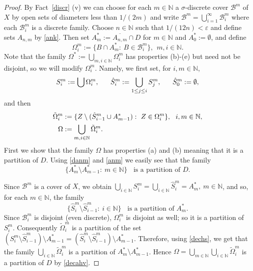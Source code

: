 \documentclass[12pt,a4paper]{amsart}
\theoremstyle{plain}
\theoremstyle{definition}
\theoremstyle{remark}
\numberwithin{equation}{section}
\newcommand{\N}{{\mathbb N}}
\newcommand{\B}{{\mathcal{B}}}
\begin{document}
\begin{proof}
	 By  Fact~\ref{discr} (v) we  can choose for each $m\in \N$ a $\sigma$-discrete cover
 $\B^m$ of $X$ by open sets of diameters
less than $1/(2m)$ 
and write $\B^m = \bigcup_{i=1}^{\infty} \B^m_i$
where each $\B^m_i$ is a discrete family.	
Choose $n\in \N$ such that $1/(12n) < \varepsilon $ and define sets $A_{n,m}$ by \eqref{ank}.
Then set  $A^*_m:= \overline{A_{n,m}} \cap D$ for $m\in \N$ and $A_0^*:= \emptyset$, and define
$$  \Omega_i^{m}:= \{ B \cap  A_m^*:\ B \in \B^m_i\},\ \ m,i \in \N. $$ 
 Note that the family $\Omega^*:= \bigcup_{m,i \in \N} \Omega_i^{m}$ has properties (b)-(e) but need not
 be disjoint, so we will modify $  \Omega_i^{m}$.
Namely, we first set,  for $i,m \in \N$,
\begin{equation}\notag
  S_i^m:= \bigcup \Omega_i^{m},\ \ \ \ \  \hat S_i^m:= \bigcup_{1\leq j\leq i} S_j^m, \ \ \  \ \ 
   \hat S_0^m:= \emptyset, 
\end{equation}
and then
\begin{equation}\notag
\begin{split} 
\tilde \Omega_i^m&:= \{ Z \setminus (\hat S_{i-1}^m \cup A^*_{m-1}):\ Z \in \Omega_i^m\},\ \ i,m\in \N, \\ 
 \Omega&:= \bigcup_{m,i \in \N} \tilde \Omega_i^m.
\end{split}
\end{equation}
First we  show that the  family $\Omega$ has properties (a) and  (b) meaning  that it is a partition of $D$.
Using \eqref{danm} and \eqref{anm}  we easily see that the family
\begin{equation}\label{decahv}
\{ A_m^* \setminus A^*_{m-1}:\ m \in \N\}\ \ \ \ \text{is a partition of } D. 
\end{equation}


Since $\B^m$ is a cover of $X$, we obtain  $\bigcup_{i\in \N} S_i^m =  \bigcup_{i\in \N} \hat S_i^m =  A^*_m,
\ m\in \N$,
 and so, for each $m\in \N$, the family
 \begin{equation}\label{dechs}
\{ \hat S_i^m \setminus  \hat S_{i-1}^m:\ i \in \N\}\ \ \ \ \text{is a partition of } A^*_m. 
\end{equation}
Since $\B_i^m$ is disjoint (even discrete), $\Omega_i^m$ is disjoint as well; so it is a partition
 of   $S_i^m$. Consequently $\tilde \Omega_i^m$ is a partition of the set
 $(S_i^m \setminus \hat S_{i-1}^m) \setminus A^*_{m-1} =
 (\hat S_i^m \setminus \hat S_{i-1}^m) \setminus A^*_{m-1}$.
Therefore, using \eqref{dechs}, we get that the family
$\bigcup_{i\in \N} \tilde \Omega_i^m$ is a partition of $ A^*_m \setminus A^*_{m-1}$.
Hence  $\Omega= \bigcup_{m\in \N} \bigcup_{i\in \N} \tilde \Omega_i^m$ is a partition
 of $D$ by \eqref{decahv}.


\end{proof}
\end{document}
